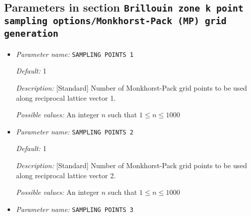 \subsection{Parameters in section \tt Brillouin zone k point sampling options/Monkhorst-Pack (MP) grid generation}
\label{parameters:Brillouin_20zone_20k_20point_20sampling_20options/Monkhorst_2dPack_20_28MP_29_20grid_20generation}

\begin{itemize}
\item {\it Parameter name:} {\tt SAMPLING POINTS 1}
\label{parameters:Brillouin zone k point sampling options/Monkhorst_2dPack _28MP_29 grid generation/SAMPLING POINTS 1}
\label{parameters:Brillouin_20zone_20k_20point_20sampling_20options/Monkhorst_2dPack_20_28MP_29_20grid_20generation/SAMPLING_20POINTS_201}




{\it Default:} 1


{\it Description:} [Standard] Number of Monkhorst-Pack grid points to be used along reciprocal lattice vector 1.


{\it Possible values:} An integer $n$ such that $1\leq n \leq 1000$
\item {\it Parameter name:} {\tt SAMPLING POINTS 2}
\label{parameters:Brillouin zone k point sampling options/Monkhorst_2dPack _28MP_29 grid generation/SAMPLING POINTS 2}
\label{parameters:Brillouin_20zone_20k_20point_20sampling_20options/Monkhorst_2dPack_20_28MP_29_20grid_20generation/SAMPLING_20POINTS_202}




{\it Default:} 1


{\it Description:} [Standard] Number of Monkhorst-Pack grid points to be used along reciprocal lattice vector 2.


{\it Possible values:} An integer $n$ such that $1\leq n \leq 1000$
\item {\it Parameter name:} {\tt SAMPLING POINTS 3}
\label{parameters:Brillouin zone k point sampling options/Monkhorst_2dPack _28MP_29 grid generation/SAMPLING POINTS 3}
\label{parameters:Brillouin_20zone_20k_20point_20sampling_20options/Monkhorst_2dPack_20_28MP_29_20grid_20generation/SAMPLING_20POINTS_203}



\end{itemize}
